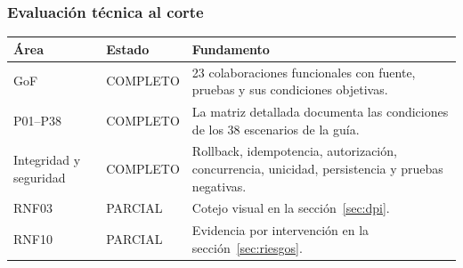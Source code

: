 

\clearpage\subsubsection{Evaluación técnica al corte}
\begin{longtable}{@{}L{.26\linewidth}L{.18\linewidth}L{.50\linewidth}@{}}
\toprule Área & Estado & Fundamento \\ \midrule\endhead
GoF & COMPLETO & 23 colaboraciones funcionales con fuente, pruebas y sus condiciones objetivas. \\
P01--P38 & COMPLETO & La matriz detallada documenta las condiciones de los 38 escenarios de la guía. \\
Integridad y seguridad & COMPLETO & Rollback, idempotencia, autorización, concurrencia, unicidad, persistencia y pruebas negativas. \\
RNF03 & PARCIAL & Cotejo visual en la sección~\ref{sec:dpi}. \\
RNF10 & PARCIAL & Evidencia por intervención en la sección~\ref{sec:riesgos}. \\
\bottomrule
\end{longtable}

